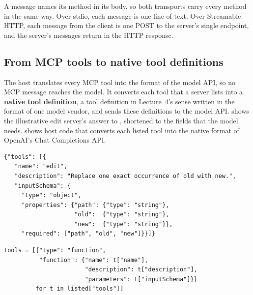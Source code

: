 A message names its method in its body, so both transports carry every method in the same way.
Over stdio, each message is one line of text. Over Streamable HTTP, each message from the client is
one POST to the server's single endpoint, and the server's messages return in the HTTP response.

\subsection{From MCP tools to native tool definitions}
\label{sec:mcp-native}

The host translates every MCP tool into the format of the model API, so no MCP message reaches the
model. It converts each tool that a server lists into a \textbf{native tool definition}, a tool
definition in Lecture~4's sense written in the format of one model vendor, and sends these
definitions to the model API.  shows the illustrative edit
server's answer to , shortened to the fields that the model needs.
 shows host code that converts each listed tool into the native format of
OpenAI's Chat Completions API.

\noindent\begin{minipage}{\linewidth}
\begin{lstlisting}[basicstyle=\ttfamily\footnotesize, caption={Illustrative answer of the edit server to \texttt{tools/list}, shortened to the fields that the model receives.}, label=lst:mcp-toolslist]
{"tools": [{
   "name": "edit",
   "description": "Replace one exact occurrence of old with new.",
   "inputSchema": {
     "type": "object",
     "properties": {"path": {"type": "string"},
                    "old":  {"type": "string"},
                    "new":  {"type": "string"}},
     "required": ["path", "old", "new"]}}]}
\end{lstlisting}
\end{minipage}

\noindent\begin{minipage}{\linewidth}
\begin{lstlisting}[basicstyle=\ttfamily\footnotesize, caption={Illustrative host code that builds one native tool definition for each listed tool.}, label=lst:mcp-convert]
tools = [{"type": "function",
          "function": {"name": t["name"],
                       "description": t["description"],
                       "parameters": t["inputSchema"]}}
         for t in listed["tools"]]
\end{lstlisting}
\end{minipage}

